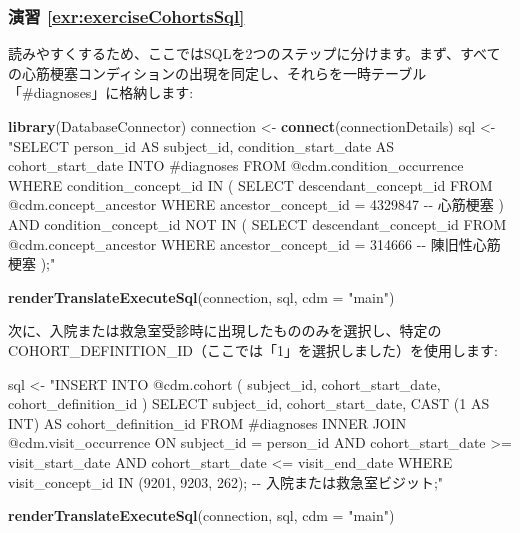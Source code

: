 \documentclass[
  11pt]{book}
\newenvironment{Shaded}{\begin{snugshade}}{\end{snugshade}}
\newcommand{\AttributeTok}[1]{\textcolor[rgb]{0.13,0.29,0.53}{#1}}
\newcommand{\FunctionTok}[1]{\textcolor[rgb]{0.13,0.29,0.53}{\textbf{#1}}}
\newcommand{\NormalTok}[1]{#1}
\newcommand{\OtherTok}[1]{\textcolor[rgb]{0.56,0.35,0.01}{#1}}
\newcommand{\StringTok}[1]{\textcolor[rgb]{0.31,0.60,0.02}{#1}}
\theoremstyle{definition}
\theoremstyle{definition}
\theoremstyle{definition}
\theoremstyle{definition}
\theoremstyle{remark}
\begin{document}
\subsubsection*{演習 \ref{exr:exerciseCohortsSql}}\label{ux6f14ux7fd2-refexrexercisecohortssql}

読みやすくするため、ここではSQLを2つのステップに分けます。まず、すべての心筋梗塞コンディションの出現を同定し、それらを一時テーブル「\#diagnoses」に格納します:

\begin{Shaded}
\begin{Highlighting}[]
\FunctionTok{library}\NormalTok{(DatabaseConnector)}
\NormalTok{connection }\OtherTok{\textless{}{-}} \FunctionTok{connect}\NormalTok{(connectionDetails)}
\NormalTok{sql }\OtherTok{\textless{}{-}} \StringTok{"SELECT person\_id AS subject\_id,}
\StringTok{  condition\_start\_date AS cohort\_start\_date}
\StringTok{INTO \#diagnoses}
\StringTok{FROM @cdm.condition\_occurrence}
\StringTok{WHERE condition\_concept\_id IN (}
\StringTok{    SELECT descendant\_concept\_id}
\StringTok{    FROM @cdm.concept\_ancestor}
\StringTok{    WHERE ancestor\_concept\_id = 4329847 {-}{-} 心筋梗塞}
\StringTok{)}
\StringTok{  AND condition\_concept\_id NOT IN (}
\StringTok{    SELECT descendant\_concept\_id}
\StringTok{    FROM @cdm.concept\_ancestor}
\StringTok{    WHERE ancestor\_concept\_id = 314666 {-}{-} 陳旧性心筋梗塞}
\StringTok{);"}

\FunctionTok{renderTranslateExecuteSql}\NormalTok{(connection, sql, }\AttributeTok{cdm =} \StringTok{"main"}\NormalTok{)}
\end{Highlighting}
\end{Shaded}

次に、入院または救急室受診時に出現したもののみを選択し、特定のCOHORT\_DEFINITION\_ID（ここでは「1」を選択しました）を使用します:

\begin{Shaded}
\begin{Highlighting}[]
\NormalTok{sql }\OtherTok{\textless{}{-}} \StringTok{"INSERT INTO @cdm.cohort (}
\StringTok{  subject\_id,}
\StringTok{  cohort\_start\_date,}
\StringTok{  cohort\_definition\_id}
\StringTok{  )}
\StringTok{SELECT subject\_id,}
\StringTok{  cohort\_start\_date,}
\StringTok{  CAST (1 AS INT) AS cohort\_definition\_id}
\StringTok{FROM \#diagnoses}
\StringTok{INNER JOIN @cdm.visit\_occurrence}
\StringTok{  ON subject\_id = person\_id}
\StringTok{    AND cohort\_start\_date \textgreater{}= visit\_start\_date}
\StringTok{    AND cohort\_start\_date \textless{}= visit\_end\_date}
\StringTok{WHERE visit\_concept\_id IN (9201, 9203, 262); {-}{-} 入院または救急室ビジット;"}

\FunctionTok{renderTranslateExecuteSql}\NormalTok{(connection, sql, }\AttributeTok{cdm =} \StringTok{"main"}\NormalTok{)}
\end{Highlighting}
\end{Shaded}
\end{document}
